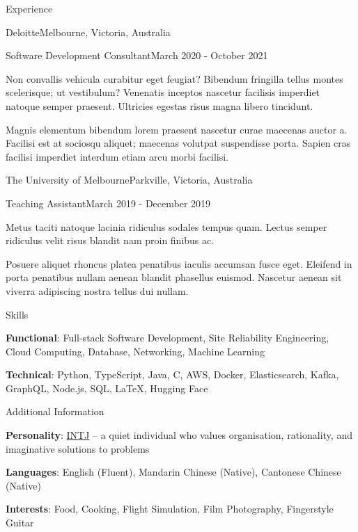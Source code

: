 \documentclass{cv}
\begin{document}
\begin{cvsection}{Experience}
\begin{cvheading}{Deloitte}{Melbourne, Victoria, Australia}
\begin{cvsubheading}{Software Development Consultant}{March 2020 - October 2021}
\item Non convallis vehicula curabitur eget feugiat? Bibendum fringilla tellus montes scelerisque; ut vestibulum? Venenatis inceptos nascetur facilisis imperdiet natoque semper praesent. Ultricies egestas risus magna libero tincidunt.
\item Magnis elementum bibendum lorem praesent nascetur curae maecenas auctor a. Facilisi est at sociosqu aliquet; maecenas volutpat suspendisse porta. Sapien cras facilisi imperdiet interdum etiam arcu morbi facilisi.
\end{cvsubheading}
\end{cvheading}

\begin{cvheading}{The University of Melbourne}{Parkville, Victoria, Australia}
\begin{cvsubheading}{Teaching Assistant}{March 2019 - December 2019}
\item Metus taciti natoque lacinia ridiculus sodales tempus quam. Lectus semper ridiculus velit risus blandit nam proin finibus ac.
\item Posuere aliquet rhoncus platea penatibus iaculis accumsan fusce eget. Eleifend in porta penatibus nullam aenean blandit phasellus euismod. Nascetur aenean sit viverra adipiscing nostra tellus dui nullam.
\end{cvsubheading}
\end{cvheading}

\end{cvsection}

\begin{cvsection}{Skills}
\item \textbf{Functional}: Full-stack Software Development, Site Reliability Engineering, Cloud Computing, Database, Networking, Machine Learning
\item \textbf{Technical}: Python, TypeScript, Java, C, AWS, Docker, Elasticsearch, Kafka, GraphQL, Node.js, SQL, \LaTeX, Hugging Face
\end{cvsection}

\begin{cvsection}{Additional Information}
\item \textbf{Personality}: \href{https://www.16personalities.com/intj-personality}{INTJ} -- a quiet individual who values organisation, rationality, and imaginative solutions to problems
\item \textbf{Languages}: English (Fluent), Mandarin Chinese (Native), Cantonese Chinese (Native)
\item \textbf{Interests}: Food, Cooking, Flight Simulation, Film Photography, Fingerstyle Guitar
\end{cvsection}
\end{document}
